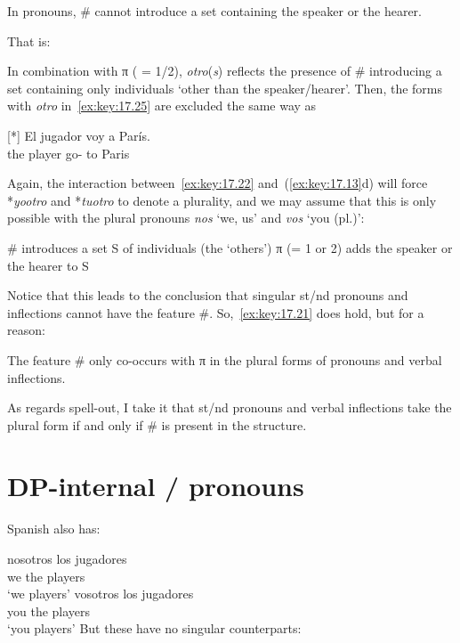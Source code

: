 \documentclass[output=paper]{langsci/langscibook}
\begin{document}
\begin{exe}
\exi{\eqref{ex:key:17.22}}
    In pronouns, \# cannot introduce a set containing the speaker or the hearer.
\end{exe}
That is:

\ea\label{ex:key:17.26}
    In combination with π ( = 1/2), \emph{otro}(\emph{s}) reflects the presence
    of \# introducing a set containing only individuals ‘other than the
    speaker/hearer’.
\z
Then, the forms with \emph{otro} in~\eqref{ex:key:17.25} are excluded the same way
as

\begin{exe}
\exi{\eqref{ex:key:17.19}}[*]{%
    \gll El jugador voy a París.\\
        the player go-\Fsg{} to Paris\\
    \glt}
\end{exe}
Again, the interaction between~\eqref{ex:key:17.22} and~(\ref{ex:key:17.13}d) will
force *\emph{yootro} and *\emph{tuotro} to denote a plurality, and we may
assume that this is only possible with the plural pronouns \emph{nos} ‘we, us’
and \emph{vos} ‘you (pl.)’:

\begin{exe}
\exi{\eqref{ex:key:17.13}}
\begin{xlist}
     \# introduces a set S of individuals (the ‘others’)
     π (= 1 or 2) adds the speaker or the hearer to S
\end{xlist}
\end{exe}
Notice that this leads to the conclusion that singular \First{}st/\Second{}nd
pronouns and inflections cannot have the feature \#. So,~\eqref{ex:key:17.21} does
hold, but for a reason:

\begin{exe}
\exi{\eqref{ex:key:17.21}}
    The feature \# only co-occurs with π in the plural forms of pronouns
    and verbal inflections.
\end{exe}
As regards spell-out, I take it that \First{}st/\Second{}nd pronouns and verbal
inflections take the plural form if and only if \# is present in the structure.

\section{DP-internal \First/\Spl{} pronouns}\label{sec:key:17.6}

Spanish also has:

\ea\label{ex:key:17.27}
    \ea
    \gll    nosotros los jugadores\\
            we          the players\\
    \glt    \enquote*{we players}
    \ex
    \gll    vosotros los jugadores\\
            you          the players\\
    \glt    \enquote*{you players}
    \z
\z
But these have no singular counterparts:
\end{document}
